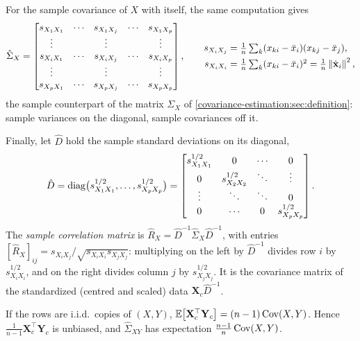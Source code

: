 \begin{notechapter}
For the sample covariance of $X$ with itself, the same computation gives
\[
  \hat\Sigma_X =
  \begin{bmatrix}
    s_{X_1X_1} & \cdots & s_{X_1X_j} & \cdots & s_{X_1X_p}\\
    \vdots & & \vdots & & \vdots\\
    s_{X_iX_1} & \cdots & s_{X_iX_j} & \cdots & s_{X_iX_p}\\
    \vdots & & \vdots & & \vdots\\
    s_{X_pX_1} & \cdots & s_{X_pX_j} & \cdots & s_{X_pX_p}
  \end{bmatrix},
  \qquad
  \begin{aligned}
    s_{X_iX_j} &= \tfrac1n\textstyle\sum_k(x_{ki} - \bar x_i)(x_{kj} - \bar x_j),\\
    s_{X_iX_i} &= \tfrac1n\textstyle\sum_k(x_{ki} - \bar x_i)^2 = \tfrac1n\left\|\dot{\mathbf x}_i\right\|^2,
  \end{aligned}
\]
the sample counterpart of the matrix $\Sigma_X$ of
\cref{covariance-estimation:sec:definition}: sample variances on the diagonal,
sample covariances off it.

Finally, let $\hat D$ hold the sample standard deviations on its diagonal,
\[
  \hat D = \operatorname{diag}\bigl(s_{X_1X_1}^{1/2},\dots,s_{X_pX_p}^{1/2}\bigr)
  = \begin{bmatrix}
    s_{X_1X_1}^{1/2} & 0 & \cdots & 0\\
    0 & s_{X_2X_2}^{1/2} & \ddots & \vdots\\
    \vdots & \ddots & \ddots & 0\\
    0 & \cdots & 0 & s_{X_pX_p}^{1/2}
  \end{bmatrix}.
\]
The \emph{sample correlation matrix} is $\hat R_X = \hat D^{-1}\hat\Sigma_X\hat D^{-1}$,
with entries $[\hat R_X]_{ij} = s_{X_iX_j}/\sqrt{s_{X_iX_i}s_{X_jX_j}}$: multiplying
on the left by $\hat D^{-1}$ divides row $i$ by $s_{X_iX_i}^{1/2}$, and on the right
divides column $j$ by $s_{X_jX_j}^{1/2}$. It is the covariance matrix of the
standardized (centred and scaled) data $\mathbf X_c\hat D^{-1}$.

\begin{proposition}\label{covariance-estimation:prop:bias}
If the rows are i.i.d.\ copies of $(X,Y)$,
$\mathbb{E}\bigl[\mathbf X_c^\top\mathbf Y_c\bigr] = (n-1)\operatorname{Cov}(X,Y)$. Hence
$\frac1{n-1}\mathbf X_c^\top\mathbf Y_c$ is unbiased, and $\hat\Sigma_{XY}$ has
expectation $\frac{n-1}n\operatorname{Cov}(X,Y)$.
\end{proposition}


\end{notechapter}

